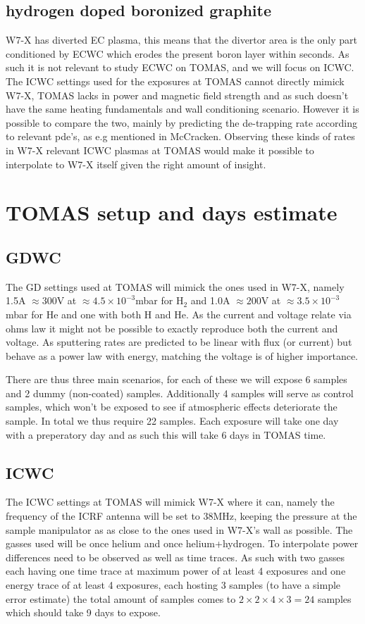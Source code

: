 \documentclass{article}
\begin{document}
\subsection*{hydrogen doped boronized graphite}
W7-X has diverted EC plasma, this means that the divertor area is the only part
conditioned by ECWC which erodes the present boron layer within seconds.  As
such it is not relevant to study ECWC on TOMAS, and we will focus on ICWC.  The
ICWC settings used for the exposures at TOMAS cannot directly mimick W7-X,
TOMAS lacks in power and magnetic field strength and as such doesn't have the
same heating fundamentals and wall conditioning scenario.  However it is
possible to compare the two, mainly by predicting the de-trapping rate
according to relevant pde's, as e.g mentioned in McCracken\cite{McCRACKEN}.
Observing these kinds of rates in W7-X relevant ICWC plasmas at TOMAS would
make it possible to interpolate to W7-X itself given the right amount of insight.
\section{TOMAS setup and days estimate}
\subsection*{GDWC}
The GD settings used at TOMAS will mimick the ones used in W7-X, namely 1.5A
$\approx300$V at $\approx4.5\times10^{-3}$mbar  for H$_2$ and 1.0A $\approx
200$V at $\approx 3.5\times10^{-3}$mbar for He\cite{AndreiNucMatEn} and one with
both H and He.  As the
current and voltage relate via ohms law it might not be possible to exactly
reproduce both the current and voltage. As sputtering rates are predicted to be linear
with flux (or current) but behave as a power law with energy, matching the voltage is 
of higher importance.

There are thus three main scenarios, for each of these we will expose 6 samples
and 2 dummy (non-coated) samples. Additionally 4 samples will serve as control
samples, which won't be exposed to see if atmospheric effects deteriorate the
sample. In total we thus require 22 samples.  Each exposure will take one day
with a preperatory day and as such this will take 6 days in TOMAS time.
\subsection*{ICWC}
The ICWC settings at TOMAS will mimick W7-X where it can, namely the frequency
of the ICRF antenna will be set to 38MHz, keeping the pressure at the sample
manipulator as as close to the ones used in W7-X's wall as possible. The gasses
used will be once helium and once helium+hydrogen. To interpolate power
differences need to be observed as well as time traces. As such with two gasses 
each having one time trace at maximum power of at least 4 exposures and one energy
trace of at least 4 exposures, each hosting 3 samples (to have a simple error estimate)
the total amount of samples comes to $2\times 2\times 4\times 3=24$ samples which
should take 9 days to expose.
\end{document}
